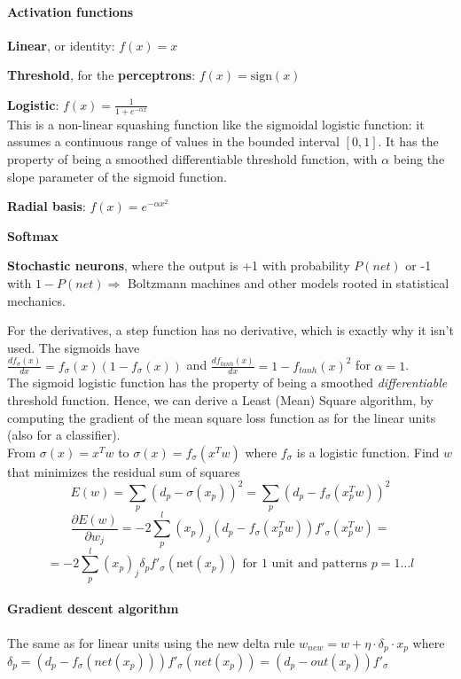 \documentclass[10pt]{report}
\begin{document}
\paragraph{Activation functions}
\begin{list}{}{}
	\item \textbf{Linear}, or identity: $f(x) = x$
	\item \textbf{Threshold}, for the \textbf{perceptrons}: $f(x) = \text{sign}(x)$
	\item \textbf{Logistic}: $f(x) = \frac{1}{1 + e^{-\alpha x}}$\\
	This is a non-linear squashing function like the sigmoidal logistic function: it assumes a continuous range of values in the bounded interval $[0,1]$. It has the property of being a smoothed differentiable threshold function, with $\alpha$ being the slope parameter of the sigmoid function.
	\item \textbf{Radial basis}: $f(x) = e^{-\alpha x^2}$
	\item \textbf{Softmax}
	\item \textbf{Stochastic neurons}, where the output is +1 with probability $P(net)$ or -1 with $1-P(net) \Rightarrow$ Boltzmann machines and other models rooted in statistical mechanics.
\end{list}
For the derivatives, a step function has no derivative, which is exactly why it isn't used. The sigmoids have\\$\frac{df_\sigma(x)}{dx} = f_\sigma(x) (1-f_\sigma(x))$ and $\frac{df_{tanh}(x)}{dx} = 1 - f_{tanh}(x)^2$ for $\alpha = 1$.\\
The sigmoid logistic function has the property of being a smoothed \textit{differentiable} threshold function. Hence, we can derive a Least (Mean) Square algorithm, by computing the gradient of the mean square loss function as for the linear units (also for a classifier).\\
From $\sigma(x) = x^Tw$ to $\sigma(x) = f_\sigma(x^Tw)$ where $f_\sigma$ is a logistic function. Find $w$ that minimizes the residual sum of squares $$E(w) = \sum_p (d_p - \sigma(x_p))^2 = \sum_p (d_p - f_\sigma(x_p^Tw))^2$$
$$\frac{\partial E(w)}{\partial w_j} = -2\sum_p^l (x_p)_j (d_p - f_\sigma(x_p^Tw))f'_\sigma(x_p^Tw) =$$ $$= -2\sum_p^l(x_p)_j\delta_pf'_\sigma(\text{net}(x_p))\text{ for 1 unit and patterns }p = 1\ldots l$$
\paragraph{Gradient descent algorithm} 
The same as for linear units using the new delta rule $w_{new} = w + \eta\cdot\delta_p\cdot x_p$ where $\delta_p = (d_p - f_\sigma(net(x_p)))f'_\sigma(net(x_p)) = (d_p-out(x_p))f'_\sigma$
\end{document}

